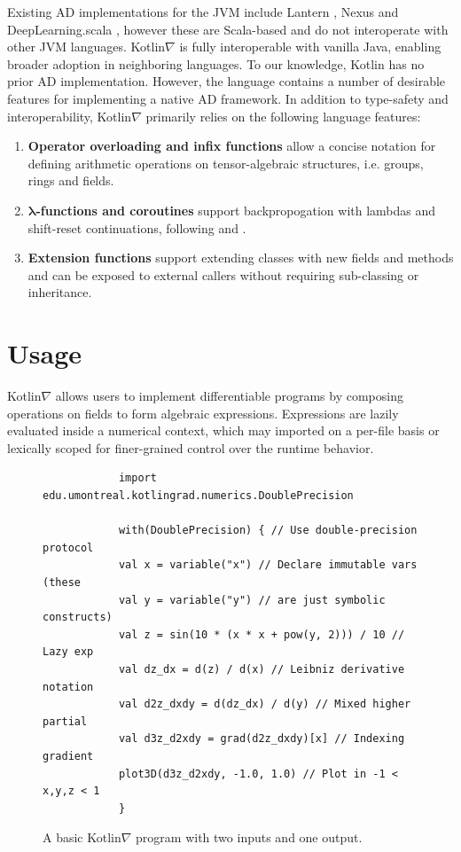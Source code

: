 \documentclass{article}
\newcommand{\squeezeup}{\vspace{-2.5mm}}
\begin{document}
    Existing AD implementations for the JVM include Lantern \cite{DBLP:journals/corr/abs-1803-10228}, Nexus \cite{chen2017typesafe} and DeepLearning.scala \cite{dl4s}, however these are Scala-based and do not interoperate with other JVM languages. Kotlin$\nabla$ is fully interoperable with vanilla Java, enabling broader adoption in neighboring languages. To our knowledge, Kotlin has no prior AD implementation. However, the language contains a number of desirable features for implementing a native AD framework. In addition to type-safety and interoperability, Kotlin$\nabla$ primarily relies on the following language features:
    \squeezeup\squeezeup
    \begin{enumerate}[itemsep=-0.5ex]
        \item \textbf{Operator overloading and infix functions} allow a concise notation for defining arithmetic operations on tensor-algebraic structures, i.e. groups, rings and fields.
        \item \textbf{$\mathbf{\lambda}$-functions and coroutines} support backpropogation with lambdas and shift-reset continuations, following \citealt{pearlmutter2008reverse} and \citealt{DBLP:journals/corr/abs-1803-10228}.
        \item \textbf{Extension functions} support extending classes with new fields and methods and can be exposed to external callers without requiring sub-classing or inheritance.
    \end{enumerate}
    \squeezeup\squeezeup
    \section{Usage}

    Kotlin$\nabla$ allows users to implement differentiable programs by composing operations on fields to form algebraic expressions. Expressions are lazily evaluated inside a numerical context, which may imported on a per-file basis or lexically scoped for finer-grained control over the runtime behavior.

    \begin{figure}[!htb]
        \begin{verbatim}
            import edu.umontreal.kotlingrad.numerics.DoublePrecision

            with(DoublePrecision) { // Use double-precision protocol
            val x = variable("x") // Declare immutable vars (these
            val y = variable("y") // are just symbolic constructs)
            val z = sin(10 * (x * x + pow(y, 2))) / 10 // Lazy exp
            val dz_dx = d(z) / d(x) // Leibniz derivative notation
            val d2z_dxdy = d(dz_dx) / d(y) // Mixed higher partial
            val d3z_d2xdy = grad(d2z_dxdy)[x] // Indexing gradient
            plot3D(d3z_d2xdy, -1.0, 1.0) // Plot in -1 < x,y,z < 1
            }
        \end{verbatim}
        \squeezeup\squeezeup
        \caption{A basic Kotlin$\nabla$ program with two inputs and one output.}
        \label{label:fig1}
    \end{figure}
\end{document}
